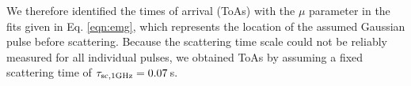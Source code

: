 \documentclass[fleqn,usenatbib]{mnras}
\begin{document}
\begin{figure}[th]
                  \label{fig:stacked_spectra}
\end{figure}

We therefore identified the times of arrival (ToAs) with the $\mu$ parameter in the fits given in Eq. \eqref{eqn:emg}, which represents the location of the assumed Gaussian pulse before scattering.
Because the scattering time scale could not be reliably measured for all individual pulses, we obtained ToAs by assuming a fixed scattering time of $\tau_{\rm sc,1 GHz} = 0.07\,$s.

\end{document}
